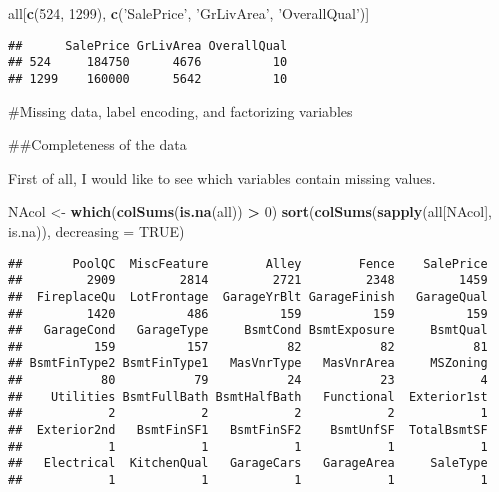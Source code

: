 \documentclass[]{article}
\newenvironment{Shaded}{\begin{snugshade}}{\end{snugshade}}
\newcommand{\DataTypeTok}[1]{\textcolor[rgb]{0.13,0.29,0.53}{#1}}
\newcommand{\DecValTok}[1]{\textcolor[rgb]{0.00,0.00,0.81}{#1}}
\newcommand{\KeywordTok}[1]{\textcolor[rgb]{0.13,0.29,0.53}{\textbf{#1}}}
\newcommand{\NormalTok}[1]{#1}
\newcommand{\OperatorTok}[1]{\textcolor[rgb]{0.81,0.36,0.00}{\textbf{#1}}}
\newcommand{\OtherTok}[1]{\textcolor[rgb]{0.56,0.35,0.01}{#1}}
\newcommand{\StringTok}[1]{\textcolor[rgb]{0.31,0.60,0.02}{#1}}
\begin{document}
\begin{Shaded}
\begin{Highlighting}[]
\NormalTok{all[}\KeywordTok{c}\NormalTok{(}\DecValTok{524}\NormalTok{, }\DecValTok{1299}\NormalTok{), }\KeywordTok{c}\NormalTok{(}\StringTok{'SalePrice'}\NormalTok{, }\StringTok{'GrLivArea'}\NormalTok{, }\StringTok{'OverallQual'}\NormalTok{)]}
\end{Highlighting}
\end{Shaded}

\begin{verbatim}
##      SalePrice GrLivArea OverallQual
## 524     184750      4676          10
## 1299    160000      5642          10
\end{verbatim}

\#Missing data, label encoding, and factorizing variables

\#\#Completeness of the data

First of all, I would like to see which variables contain missing
values.

\begin{Shaded}
\begin{Highlighting}[]
\NormalTok{NAcol <-}\StringTok{ }\KeywordTok{which}\NormalTok{(}\KeywordTok{colSums}\NormalTok{(}\KeywordTok{is.na}\NormalTok{(all)) }\OperatorTok{>}\StringTok{ }\DecValTok{0}\NormalTok{)}
\KeywordTok{sort}\NormalTok{(}\KeywordTok{colSums}\NormalTok{(}\KeywordTok{sapply}\NormalTok{(all[NAcol], is.na)), }\DataTypeTok{decreasing =} \OtherTok{TRUE}\NormalTok{)}
\end{Highlighting}
\end{Shaded}

\begin{verbatim}
##       PoolQC  MiscFeature        Alley        Fence    SalePrice 
##         2909         2814         2721         2348         1459 
##  FireplaceQu  LotFrontage  GarageYrBlt GarageFinish   GarageQual 
##         1420          486          159          159          159 
##   GarageCond   GarageType     BsmtCond BsmtExposure     BsmtQual 
##          159          157           82           82           81 
## BsmtFinType2 BsmtFinType1   MasVnrType   MasVnrArea     MSZoning 
##           80           79           24           23            4 
##    Utilities BsmtFullBath BsmtHalfBath   Functional  Exterior1st 
##            2            2            2            2            1 
##  Exterior2nd   BsmtFinSF1   BsmtFinSF2    BsmtUnfSF  TotalBsmtSF 
##            1            1            1            1            1 
##   Electrical  KitchenQual   GarageCars   GarageArea     SaleType 
##            1            1            1            1            1
\end{verbatim}
\end{document}

